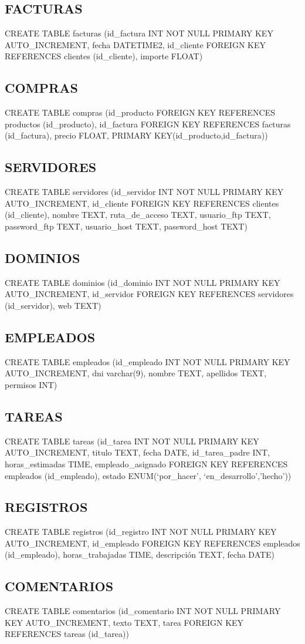 \documentclass[paper=a4, fontsize=11pt, spanish]{scrartcl}
\begin{document}
\subsection{FACTURAS}
CREATE TABLE facturas (id\_factura INT NOT NULL PRIMARY KEY AUTO\_INCREMENT, fecha DATETIME2, id\_cliente FOREIGN KEY REFERENCES clientes (id\_cliente), importe FLOAT)

\subsection{COMPRAS}
CREATE TABLE compras (id\_producto FOREIGN KEY REFERENCES productos (id\_producto), id\_factura FOREIGN KEY REFERENCES facturas (id\_factura), precio FLOAT, PRIMARY KEY(id\_producto,id\_factura))

\subsection{SERVIDORES}
CREATE TABLE servidores (id\_servidor INT NOT NULL PRIMARY KEY AUTO\_INCREMENT, id\_cliente FOREIGN KEY REFERENCES clientes (id\_cliente), nombre TEXT,  ruta\_de\_acceso TEXT, usuario\_ftp TEXT, password\_ftp TEXT, usuario\_host TEXT, password\_host TEXT)

\subsection{DOMINIOS}
CREATE TABLE dominios (id\_dominio INT NOT NULL PRIMARY KEY AUTO\_INCREMENT, id\_servidor FOREIGN KEY REFERENCES servidores (id\_servidor), web TEXT)

\subsection{EMPLEADOS}
CREATE TABLE empleados (id\_empleado INT NOT NULL PRIMARY KEY AUTO\_INCREMENT, dni varchar(9),  nombre TEXT, apellidos TEXT, permisos INT)

\subsection{TAREAS}
CREATE TABLE tareas (id\_tarea INT NOT NULL PRIMARY KEY AUTO\_INCREMENT, titulo TEXT, fecha DATE, id\_tarea\_padre INT, horas\_estimadas TIME, empleado\_asignado FOREIGN KEY REFERENCES empleados (id\_empleado), estado ENUM(‘por\_hacer’, ‘en\_desarrollo’,’hecho’))

\subsection{REGISTROS}
CREATE TABLE registros (id\_registro INT NOT NULL PRIMARY KEY AUTO\_INCREMENT, id\_empleado FOREIGN KEY REFERENCES empleados (id\_empleado), horas\_trabajadas TIME, descripción TEXT, fecha DATE)

\subsection{COMENTARIOS}
CREATE TABLE comentarios (id\_comentario INT NOT NULL PRIMARY KEY AUTO\_INCREMENT, texto TEXT, tarea FOREIGN KEY REFERENCES tareas (id\_tarea))
\end{document}
